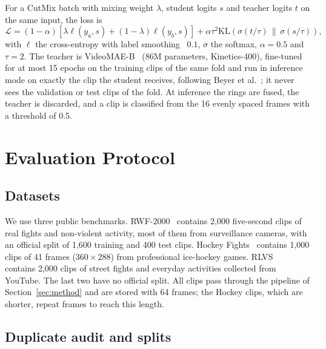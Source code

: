 \documentclass[conference]{IEEEtran}
\begin{document}
For a CutMix batch with mixing weight $\lambda$, student logits
$s$ and teacher logits $t$ on the same input, the loss is
\begin{equation}
  \mathcal{L} = (1-\alpha)\left[\lambda \ell(y_a, s) + (1-\lambda) \ell(y_b, s)\right]
  + \alpha \tau^2 \mathrm{KL}\!\left(\sigma(t/\tau) \,\|\, \sigma(s/\tau)\right),
  \label{eq:kd}
\end{equation}
with $\ell$ the cross-entropy with label smoothing~\cite{labelsmoothing}
$0.1$, $\sigma$ the softmax, $\alpha = 0.5$ and $\tau = 2$. The teacher is
VideoMAE-B~\cite{videomae} (86M parameters, Kinetics-400), fine-tuned for
at most 15 epochs on the training clips of the same fold and run in
inference mode on exactly the clip the student receives, following Beyer et
al.~\cite{beyer2022}; it never sees the validation or test clips of the
fold. At inference the rings are fused, the teacher is discarded, and a
clip is classified from the 16 evenly spaced frames with a threshold of
0.5.

\section{Evaluation Protocol}
\label{sec:protocol}

\subsection{Datasets}

We use three public benchmarks.
RWF-2000~\cite{rwf2000} contains 2{,}000 five-second clips of real fights
and non-violent activity, most of them from surveillance cameras, with an
official split of 1{,}600 training and 400 test clips. Hockey
Fights~\cite{hockey} contains 1{,}000 clips of 41 frames ($360\times288$)
from professional ice-hockey games. RLVS~\cite{rlvs} contains 2{,}000 clips
of street fights and everyday activities collected from YouTube. The last
two have no official split. All clips pass through the pipeline of
Section~\ref{sec:method} and are stored with 64 frames; the Hockey clips,
which are shorter, repeat frames to reach this length.

\subsection{Duplicate audit and splits}
\end{document}
